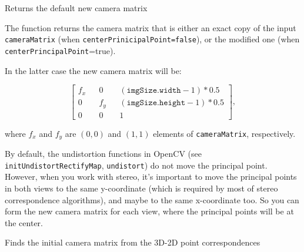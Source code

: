 Returns the default new camera matrix

\begin{description}
\end{description}

The function returns the camera matrix that is either an exact copy of the input \texttt{cameraMatrix} (when \texttt{centerPrinicipalPoint=false}), or the modified one (when \texttt{centerPrincipalPoint}=true).

In the latter case the new camera matrix will be:

\[\begin{bmatrix}
f_x && 0 && (\texttt{imgSize.width}-1)*0.5 \\
0 && f_y && (\texttt{imgSize.height}-1)*0.5 \\
0 && 0 && 1
\end{bmatrix},\]

where $f_x$ and $f_y$ are $(0,0)$ and $(1,1)$ elements of \texttt{cameraMatrix}, respectively.

By default, the undistortion functions in OpenCV (see \texttt{initUndistortRectifyMap}, \texttt{undistort}) do not move the principal point. However, when you work with stereo, it's important to move the principal points in both views to the same y-coordinate (which is required by most of stereo correspondence algorithms), and maybe to the same x-coordinate too. So you can form the new camera matrix for each view, where the principal points will be at the center. 

Finds the initial camera matrix from the 3D-2D point correspondences

\begin{description}
\end{description}

